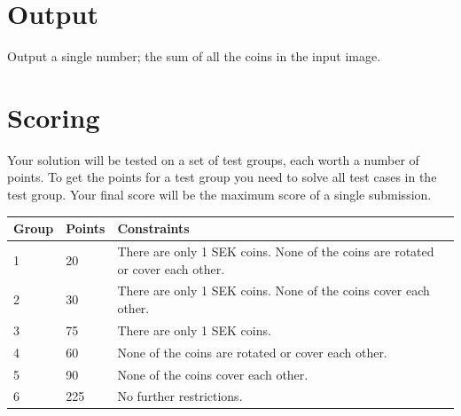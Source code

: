 \section*{Output}
Output a single number; the sum of all the coins in the input image.

\section*{Scoring}
Your solution will be tested on a set of test groups, each worth a number of points.
To get the points for a test group you need to solve all test cases in the test group.
Your final score will be the maximum score of a single submission.

\noindent
\begin{tabular}{| l | l | l |}
\hline
Group & Points & Constraints \\ \hline
1     & 20     & There are only 1 SEK coins. None of the coins are rotated or cover each other. \\ \hline
2     & 30     & There are only 1 SEK coins. None of the coins cover each other. \\ \hline
3     & 75     & There are only 1 SEK coins. \\ \hline
4     & 60     & None of the coins are rotated or cover each other. \\ \hline
5     & 90     & None of the coins cover each other. \\ \hline
6     & 225    & No further restrictions. \\ \hline
\end{tabular}
